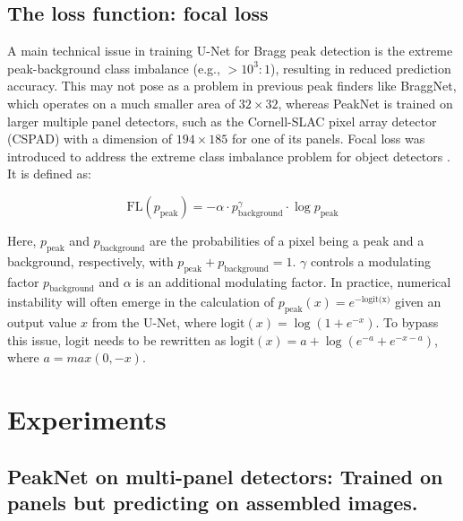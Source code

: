 \documentclass[conference]{IEEEtran}
\newcommand{\peaknet}{PeakNet}
\begin{document}
\subsection{The loss function: focal loss}

A main technical issue in training U-Net for Bragg peak detection is the extreme
peak-background class imbalance (e.g., $> 10^3 : 1$), resulting in reduced
prediction accuracy.  This may not pose as a problem in previous peak finders
like BraggNet, which operates on a much smaller area of $32 \times 32$, whereas
\peaknet{} is trained on larger multiple panel detectors, such as the
Cornell-SLAC pixel array detector (CSPAD) \citep{hartCornellSLACPixelArray2012}
with a dimension of $194 \times 185$ for one of its panels.  Focal loss was
introduced to address the extreme class imbalance problem for object detectors
\citep{linFocalLossDense2018}.  It is defined as:

\begin{equation}
    \text{FL}(p_{\text{peak}}) = -\alpha \cdot p_{\text{background}}^\gamma
    \cdot \log{p_{\text{peak}}}
\end{equation}

Here, $p_{\text{peak}}$ and $p_{\text{background}}$ are the probabilities of a
pixel being a peak and a background, respectively, with $p_{\text{peak}} +
p_{\text{background}} = 1$.  $\gamma$ controls a modulating factor
$p_{\text{background}}$ and $\alpha$ is an additional modulating factor.  In
practice, numerical instability will often emerge in the calculation of
$p_\text{peak}(x) = e^{-\text{logit(x)}}$ given an output value $x$ from the
U-Net, where $\text{logit} (x) = \log{(1 + e^{-x})}$.  To bypass this issue,
logit needs to be rewritten as $\text{logit}(x) = a + \log{(e^{-a} + e^{-x-a})}$,
where $a = max(0, -x)$.



\section{Experiments}

\subsection{\peaknet{} on multi-panel detectors: Trained on panels but
predicting on assembled images.}
\end{document}

